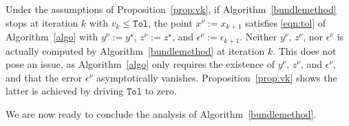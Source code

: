 \documentclass[smallextended,envcountsect]{svjour3}
\newcommand{\tol}{\texttt{Tol}}
\begin{document}
\begin{remark}\label{rem:WeDontComputeEps}
Under the assumptions of Proposition~\ref{prop:vk}, if Algorithm~\ref{bundlemethod} stops at iteration $k$ with $v_k \leq \tol$, the point $x^\nu := x_{k+1}$ satisfies \eqref{eqn:tol} of Algorithm~\ref{algo} with $y^\nu := y^\star$, $z^\nu := z^\star$, and $\epsilon^\nu := \epsilon_{k+1}$. Neither $y^\nu$, $z^\nu$, nor $\epsilon^\nu$ is actually computed by Algorithm~\ref{bundlemethod} at iteration $k$. This does not pose an issue, as Algorithm~\ref{algo} only requires the existence of $y^\nu$, $z^\nu$, and $\epsilon^\nu$, and that the error $\epsilon^\nu$ asymptotically vanishes. Proposition~\ref{prop:vk} shows the latter is achieved by driving $\tol$ to zero. 
\end{remark}
We are now ready to conclude the analysis of Algorithm~\ref{bundlemethod}.
\end{document}
